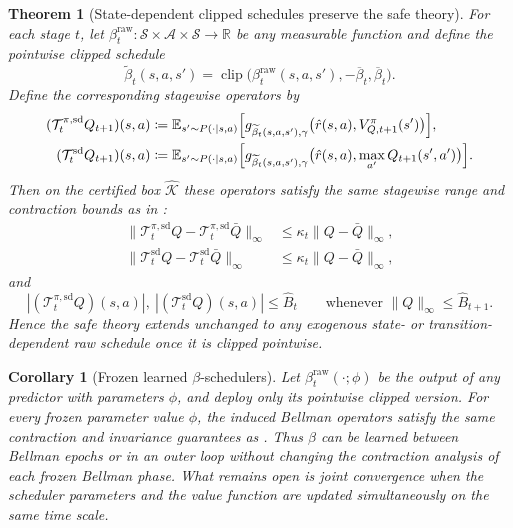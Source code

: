 \documentclass{article}
\newtheorem{theorem}{Theorem}[section]
\newtheorem{corollary}[corollary]{Corollary}
\theoremstyle{remark}
\newcommand{\R}{\mathbb{R}}
\newcommand{\E}{\mathbb{E}}
\newcommand{\defeq}{\coloneqq}
\newcommand{\cS}{\mathcal{S}}
\newcommand{\cA}{\mathcal{A}}
\newcommand{\cT}{\mathcal{T}}
\DeclareMathOperator{\clip}{clip}
\newcommand{\Ksafe}{\widehat{\mathcal K}}
\newcommand{\betacap}{\overline\beta}
\newcommand{\Bhat}{\widehat B}
\begin{document}
\begin{theorem}[State-dependent clipped schedules preserve the safe theory]
\label{thm:state-dependent-safe}
For each stage $t$, let $\beta_t^{\mathrm{raw}}:\cS\times\cA\times\cS\to\R$ be any measurable function and define the pointwise clipped schedule
\[
\widetilde\beta_t(s,a,s')
=
\clip\bigl(\beta_t^{\mathrm{raw}}(s,a,s'),-\betacap_t,\betacap_t\bigr).
\]
Define the corresponding stagewise operators by
\begin{align*}
(\cT_t^{\pi,\mathrm{sd}}Q_{t+1})(s,a)
&\defeq
\E_{s'\sim P(\cdot\mid s,a)}
\Bigl[
g_{\widetilde\beta_t(s,a,s'),\gamma}\bigl(\hat r(s,a),V_{Q,t+1}^\pi(s')\bigr)
\Bigr],\\
(\cT_t^{\mathrm{sd}}Q_{t+1})(s,a)
&\defeq
\E_{s'\sim P(\cdot\mid s,a)}
\Bigl[
g_{\widetilde\beta_t(s,a,s'),\gamma}\bigl(\hat r(s,a),\max_{a'}Q_{t+1}(s',a')\bigr)
\Bigr].
\end{align*}
Then on the certified box $\Ksafe$ these operators satisfy the same stagewise range and contraction bounds as in :
\begin{align*}
\|\cT_t^{\pi,\mathrm{sd}}Q-\cT_t^{\pi,\mathrm{sd}}\bar Q\|_\infty
&\le
\kappa_t\|Q-\bar Q\|_\infty,\\
\|\cT_t^{\mathrm{sd}}Q-\cT_t^{\mathrm{sd}}\bar Q\|_\infty
&\le
\kappa_t\|Q-\bar Q\|_\infty,
\end{align*}
and
\[
|(\cT_t^{\pi,\mathrm{sd}}Q)(s,a)|,\ |(\cT_t^{\mathrm{sd}}Q)(s,a)| \le \Bhat_t
\qquad \text{whenever } \|Q\|_\infty\le \Bhat_{t+1}.
\]
Hence the safe theory extends unchanged to any exogenous state- or transition-dependent raw schedule once it is clipped pointwise.
\end{theorem}

\begin{corollary}[Frozen learned $\beta$-schedulers]
\label{cor:frozen-learned-beta}
Let $\beta_t^{\mathrm{raw}}(\cdot;\phi)$ be the output of any predictor with parameters $\phi$, and deploy only its pointwise clipped version. For every frozen parameter value $\phi$, the induced Bellman operators satisfy the same contraction and invariance guarantees as . Thus $\beta$ can be learned between Bellman epochs or in an outer loop without changing the contraction analysis of each frozen Bellman phase. What remains open is joint convergence when the scheduler parameters and the value function are updated simultaneously on the same time scale.
\end{corollary}
\end{document}

